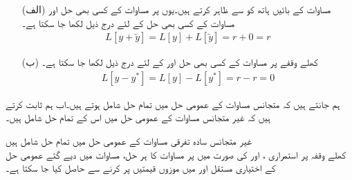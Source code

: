 \begin{enumerate}
\item[(الف)]
مساوات  کے بائیں ہاتھ کو  سے ظاہر کرتے ہیں۔یوں   پر مساوات  کے کسی بھی حل  اور مساوات  کے کسی بھی حل  کے لئے درج ذیل لکھا جا سکتا ہے۔
\begin{align*}
L[y+\tilde{y}]=L[y]+L[\tilde{y}]=r+0=r
\end{align*}
\item[(ب)]
کھلے وقفے  پر مساوات  کے کسی بھی حل  اور  کے لئے درج ذیل لکھا جا سکتا ہے۔
\begin{align*}
L[y-y^*]=L[y]-L[y^*]=r-r=0
\end{align*}
\end{enumerate}

ہم جانتے ہیں کہ متجانس مساوات  کے عمومی حل میں تمام حل شامل ہوتے ہیں۔اب ہم ثابت کرتے ہیں کہ غیر متجانس مساوات  کے عمومی حل میں اس کے تمام حل شامل ہیں۔

\quad غیر متجانس سادہ تفرقی مساوات کے عمومی حل میں تمام حل شامل ہیں\\
کھلے وقفہ  پر استمراری ،  اور  کی صورت میں  پر مساوات  کا ہر حل،  مساوات  میں دیے گئے عمومی حل کے اختیاری مستقل  اور  میں موزوں قیمتیں پر کرنے سے حاصل کیا جا سکتا ہے۔ 

